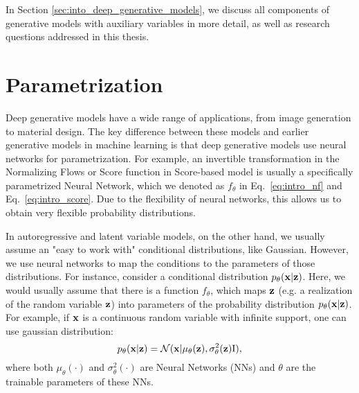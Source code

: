 In Section \ref{sec:into_deep_generative_models}, we discuss all components of generative models with auxiliary variables in more detail, as well as research questions addressed in this thesis.




\section{Parametrization}
Deep generative models have a wide range of applications, from image generation to material design. The key difference between these models and earlier generative models in machine learning is that deep generative models use neural networks for parametrization. 
For example, an invertible transformation in the Normalizing Flows or Score function in Score-based model is usually a specifically parametrized Neural Network, which we denoted as $f_{\theta}$ in Eq.~\ref{eq:intro_nf} and Eq.~\ref{eq:intro_score}. Due to the flexibility of neural networks, this allows us to obtain very flexible probability distributions. 

In autoregressive and latent variable models, on the other hand, we usually assume an "easy to work with" conditional distributions, like Gaussian. However, we use neural networks to map the conditions to the parameters of those distributions. 
For instance, consider a conditional distribution $p_{\theta}({\mathbf{x}}|{\mathbf{z}})$. Here, we would usually assume that there is a function $f_{\theta}$, which maps ${\mathbf{z}}$ (e.g. a realization of the random variable ${\mathbf{z}}$) into parameters of the probability distribution $p_{\theta}({\mathbf{x}}|{\mathbf{z}})$. For example, if ${\mathbf{x}}$ is a continuous random variable with infinite support, one can use gaussian distribution:
\begin{equation}
    p_{\theta}({\mathbf{x}}|{\mathbf{z}}) = \mathcal{N}({\mathbf{x}}| \mu_{\theta}({\mathbf{z}}), \sigma^2_{\theta}({\mathbf{z}}) \text{I}),
\end{equation}
where both $\mu_{\theta}(\cdot)$ and $\sigma^2_{\theta}(\cdot)$ are Neural Networks (NNs) and $\theta$ are the trainable parameters of these NNs. 

